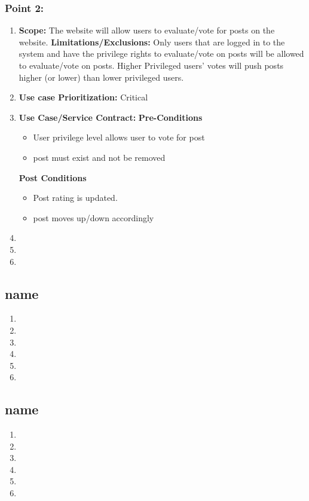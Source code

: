 \documentclass[11pt]{article}
\begin{document}
	  \subsubsection{Point 2:}
	  \begin{enumerate}
	  
	  
	  \item \textbf{Scope:} The website will allow users to evaluate/vote for posts on the website. \newline \newline
	  \textbf{Limitations/Exclusions:} Only users that are logged in to the system and have the privilege rights to evaluate/vote on posts will be allowed to evaluate/vote on posts. Higher Privileged users' votes will push posts higher (or lower) than lower privileged users. \newline \newline
	  
	  \item \textbf{Use case Prioritization: } Critical \newline \newline
	  \item \textbf{Use Case/Service Contract: } \newline \newline
	  \textbf{Pre-Conditions}
	  \begin{itemize}
	  
	  \item User privilege level allows user to vote for post
	  \item post must exist and not be removed
	  \end{itemize}
	  \textbf{Post Conditions}
	  \begin{itemize}
	  \item Post rating is updated.
	  \item post moves up/down accordingly
	  \end{itemize}
	  \item
	  \item
	  \item
	  \end{enumerate}

\newpage

\subsection{name}
\begin{enumerate}
\item 
\item 
\item 
\item 
\item 
\item 
\end{enumerate}

\newpage

\subsection{name}
\begin{enumerate}
\item 
\item 
\item 
\item 
\item 
\item 
\end{enumerate}

\newpage
\end{document}
